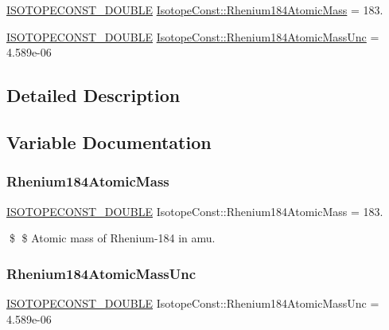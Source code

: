 \begin{DoxyCompactItemize}
\item 
\mbox{\hyperlink{group___isotope_const-_macros_ga8f45a7272ce02c0b4c65c44636ed719a}{I\+S\+O\+T\+O\+P\+E\+C\+O\+N\+S\+T\+\_\+\+D\+O\+U\+B\+LE}} \mbox{\hyperlink{group___isotope_const-_rhenium-_re184_ga671696ccece301c32db071138229e100}{Isotope\+Const\+::\+Rhenium184\+Atomic\+Mass}} = 183.
\item 
\mbox{\hyperlink{group___isotope_const-_macros_ga8f45a7272ce02c0b4c65c44636ed719a}{I\+S\+O\+T\+O\+P\+E\+C\+O\+N\+S\+T\+\_\+\+D\+O\+U\+B\+LE}} \mbox{\hyperlink{group___isotope_const-_rhenium-_re184_ga86de0b3c2c84f823f026ffcd73f01749}{Isotope\+Const\+::\+Rhenium184\+Atomic\+Mass\+Unc}} = 4.\+589e-\/06
\end{DoxyCompactItemize}


\subsection{Detailed Description}


\subsection{Variable Documentation}
\mbox{\label{group___isotope_const-_rhenium-_re184_ga671696ccece301c32db071138229e100}} 
\subsubsection{\texorpdfstring{Rhenium184\+Atomic\+Mass}{Rhenium184AtomicMass}}
{\footnotesize\ttfamily \mbox{\hyperlink{group___isotope_const-_macros_ga8f45a7272ce02c0b4c65c44636ed719a}{I\+S\+O\+T\+O\+P\+E\+C\+O\+N\+S\+T\+\_\+\+D\+O\+U\+B\+LE}} Isotope\+Const\+::\+Rhenium184\+Atomic\+Mass = 183.}

\$ \$ Atomic mass of Rhenium-\/184 in amu. \mbox{\label{group___isotope_const-_rhenium-_re184_ga86de0b3c2c84f823f026ffcd73f01749}} 
\subsubsection{\texorpdfstring{Rhenium184\+Atomic\+Mass\+Unc}{Rhenium184AtomicMassUnc}}
{\footnotesize\ttfamily \mbox{\hyperlink{group___isotope_const-_macros_ga8f45a7272ce02c0b4c65c44636ed719a}{I\+S\+O\+T\+O\+P\+E\+C\+O\+N\+S\+T\+\_\+\+D\+O\+U\+B\+LE}} Isotope\+Const\+::\+Rhenium184\+Atomic\+Mass\+Unc = 4.\+589e-\/06}

